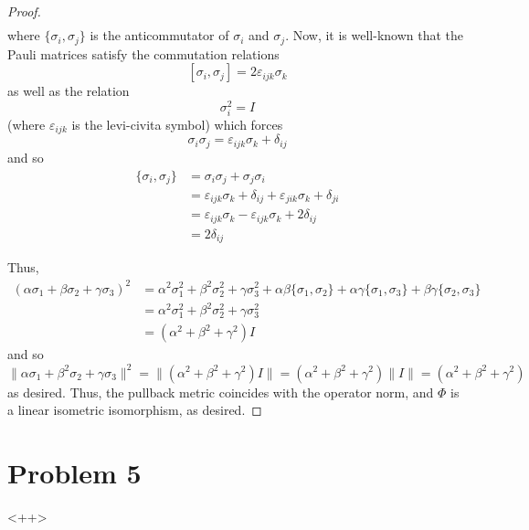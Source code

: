 \documentclass[fontsize=11pt]{scrartcl} %
\numberwithin{equation}{section} %
\numberwithin{figure}{section} %
\numberwithin{table}{section} %
\begin{document}
\begin{proof}
\[\begin{aligned}
\end{aligned}
    \]
    where $\{\sigma_i,\sigma_j\}$ is the anticommutator of $\sigma_i$ and
    $\sigma_j$. Now, it is well-known that the Pauli matrices satisfy the
    commutation relations
    \[
        [\sigma_i,\sigma_j]=2\varepsilon_{ijk}\sigma_k
    \]
    as well as the relation
    \[
        \sigma_i^2 = I
    \]
    (where $\varepsilon_{ijk}$ is the levi-civita symbol) which forces
    \[
        \sigma_i\sigma_j = \varepsilon_{ijk}\sigma_k + \delta_{ij}
    \]
    and so
    \[
        \begin{aligned}
        \{\sigma_i,\sigma_j\} &= \sigma_i\sigma_j + \sigma_j\sigma_i\\
        &= \varepsilon_{ijk}\sigma_k + \delta_{ij} + \varepsilon_{jik}\sigma_k +
        \delta_{ji}\\
        &= \varepsilon_{ijk}\sigma_k - \varepsilon_{ijk}\sigma_k +
        2\delta_{ij}\\
        &= 2\delta_{ij}
    \end{aligned}
    \]

    Thus,
    \[
\begin{aligned}
    (\alpha\sigma_1+\beta\sigma_2+\gamma\sigma_3)^2 &=
    \alpha^2\sigma_1^2 + \beta^2\sigma_2^2  + \gamma\sigma_3^2 +
    \alpha\beta\{\sigma_1,\sigma_2\} + \alpha\gamma\{\sigma_1,\sigma_3\} +
    \beta\gamma\{\sigma_2,\sigma_3\}\\
    &= 
    \alpha^2\sigma_1^2 + \beta^2\sigma_2^2  + \gamma\sigma_3^2\\
    &=(\alpha^2+\beta^2+\gamma^2)I
\end{aligned}
    \]
    and so
    \[
    \|\alpha\sigma_1 + \beta^2\sigma_2 + \gamma\sigma_3\|^2 =
    \|(\alpha^2+\beta^2+\gamma^2)I\| = (\alpha^2+\beta^2+\gamma^2)\|I\|
    =(\alpha^2+\beta^2+\gamma^2)
    \]
    as desired. Thus, the pullback metric coincides with the operator norm, and
    $\Phi$ is a linear isometric isomorphism, as desired.
\end{proof}

\newpage

\section*{Problem 5}<++>
\end{document}
